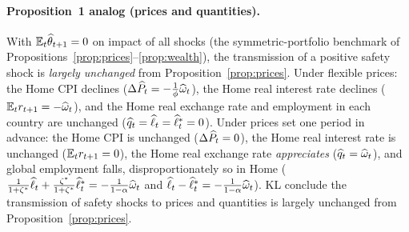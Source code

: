 \paragraph{Proposition~1 analog (prices and quantities).} With
$\mathbb{E}_t\widehat{\theta}_{t+1}=0$ on impact of all shocks (the symmetric-portfolio benchmark
of Propositions~\ref{prop:prices}--\ref{prop:wealth}), the transmission of a
positive safety shock is \emph{largely unchanged} from
Proposition~\ref{prop:prices}. Under flexible prices: the Home CPI declines
($\Delta\widehat{P}_t=-\frac{1}{\phi}\widehat{\omega}_t$), the Home real interest rate declines
($\mathbb{E}_tr_{t+1}=-\widehat{\omega}_t$), and the Home real exchange rate and employment in
each country are unchanged ($\widehat{q}_t=\widehat{\ell}_t=\widehat{\ell}^{*}_t=0$). Under
prices set one period in advance: the Home CPI is unchanged ($\Delta\widehat{P}_t=0$), the
Home real interest rate is unchanged ($\mathbb{E}_tr_{t+1}=0$), the Home real exchange
rate \emph{appreciates} ($\widehat{q}_t=\widehat{\omega}_t$), and global employment falls,
disproportionately so in Home
($\frac{1}{1+\zeta^{*}}\widehat{\ell}_t+\frac{\zeta^{*}}{1+\zeta^{*}}\widehat{\ell}^{*}_t
=-\frac{1}{1-\alpha}\widehat{\omega}_t$ and
$\widehat{\ell}_t-\widehat{\ell}^{*}_t=-\frac{1}{1-\alpha}\widehat{\omega}_t$). KL conclude the
transmission of safety shocks to prices and quantities is largely unchanged from
Proposition~\ref{prop:prices}.

